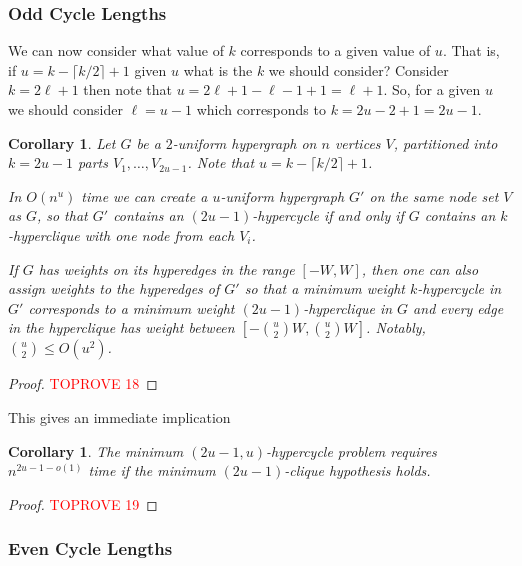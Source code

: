 \documentclass[11pt,letterpaper,pdftex]{article}
\newtheorem{corollary}[theorem]{Corollary}
\begin{document}
\subsubsection{Odd Cycle Lengths}
We can now consider what value of $k$ corresponds to a given value of $u$. That is, if $u = k- \lceil k/2 \rceil +1$ given $u$ what is the $k$ we should consider? Consider $k=2\ell +1$ then note that $u = 2\ell+1 - \ell -1+1 = \ell +1$. So, for a given $u$ we should consider $\ell = u-1$ which corresponds to $k = 2u-2+1 =  2u-1$.

\begin{corollary}
    Let $G$ be a $2$-uniform hypergraph on $n$ vertices $V$, partitioned into $k = 2u-1$ parts $V_1,\ldots,V_{2u-1}$. Note that $u=k-\lceil k/2\rceil +1$.
    
    In $O(n^{u})$ time we can create a $u$-uniform hypergraph $G'$ on the same node set $V$ as $G$, so that $G'$ contains an $(2u-1)$-hypercycle if and only if $G$ contains an $k$-hyperclique with one node from each $V_i$.
    
    If $G$ has weights on its hyperedges in the range $[-W,W]$, then one can also assign weights to the hyperedges of $G'$ so that a minimum weight $k$-hypercycle in $G'$ corresponds to a minimum weight $(2u-1)$-hyperclique in $G$ and every edge in the hyperclique has weight between $[-\binom{u}{2}W,\binom{u}{2}W]$. Notably, $\binom{u}{2}\leq O(u^2)$.
    \label{cor:reverseUandKMin}
\end{corollary}
\begin{proof}\textcolor{red}{TOPROVE 18}\end{proof}

This gives an immediate implication 

\begin{corollary}
The minimum $(2u-1,u)$-hypercycle problem requires $n^{2u-1-o(1)}$ time if the minimum $(2u-1)$-clique hypothesis holds. 
\label{cor:min2u-1ishard}
\end{corollary}
\begin{proof}\textcolor{red}{TOPROVE 19}\end{proof}

\subsubsection{Even Cycle Lengths}
\end{document}
